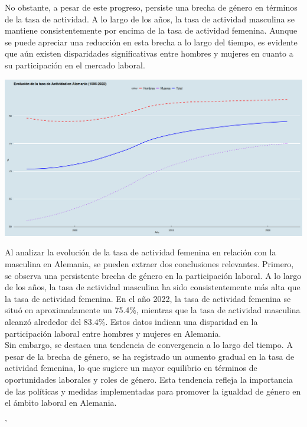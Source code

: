 No obstante, a pesar de este progreso, persiste una brecha de género en términos de la tasa de actividad. A lo largo de los años, la tasa de actividad masculina se mantiene consistentemente por encima de la tasa de actividad femenina. Aunque se puede apreciar una reducción en esta brecha a lo largo del tiempo, es evidente que aún existen disparidades significativas entre hombres y mujeres en cuanto a su participación en el mercado laboral.


    \begin{center}
	\includegraphics[scale=.32]{image/b3ej2a.png}
    \end{center}
    \vspace{.5cm}

    Al analizar la evolución de la tasa de actividad femenina en relación con la masculina en Alemania, se pueden extraer dos conclusiones relevantes. Primero, se observa una persistente brecha de género en la participación laboral. A lo largo de los años, la tasa de actividad masculina ha sido consistentemente más alta que la tasa de actividad femenina. En el año 2022, la tasa de actividad femenina se situó en aproximadamente un 75.4\%, mientras que la tasa de actividad masculina alcanzó alrededor del 83.4\%. Estos datos indican una disparidad en la participación laboral entre hombres y mujeres en Alemania.\\

Sin embargo, se destaca una tendencia de convergencia a lo largo del tiempo. A pesar de la brecha de género, se ha registrado un aumento gradual en la tasa de actividad femenina, lo que sugiere un mayor equilibrio en términos de oportunidades laborales y roles de género. Esta tendencia refleja la importancia de las políticas y medidas implementadas para promover la igualdad de género en el ámbito laboral en Alemania.

'\newpage

